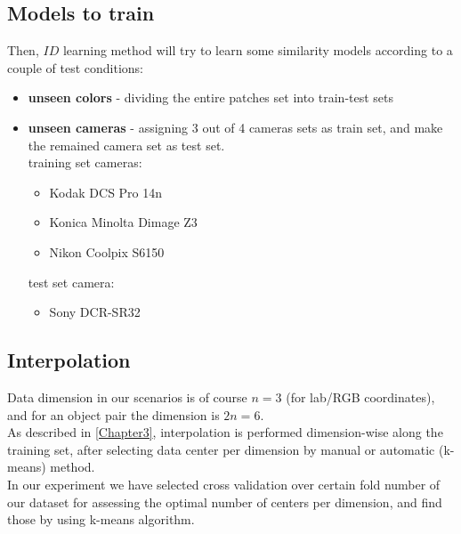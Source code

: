 \subsection{Models to train}
Then, $ID$ learning method will try to learn some similarity models according to a couple of test conditions:

\begin{itemize}
	\item \textbf{unseen colors} - dividing the entire patches set into train-test sets
	\item \textbf{unseen cameras} - assigning 3 out of 4 cameras sets as train set, and make the remained camera set as test set. \\
		training set cameras:
		\begin{itemize}
			\item Kodak DCS	Pro 14n
			\item Konica Minolta Dimage Z3
			\item Nikon Coolpix S6150
		\end{itemize}	
		
		test set camera:	
		\begin{itemize}
			\item Sony DCR-SR32
		\end{itemize}
		
\end{itemize}

\subsection{Interpolation}
Data dimension in our scenarios is of course $n=3$ (for lab/RGB \cite{RGB} coordinates), and for an object pair the dimension is $2n=6$. \\
As described in \ref{Chapter3}, interpolation is performed dimension-wise along the training set, after selecting data center per dimension by manual or automatic (k-means) method.
\\
In our experiment we have selected cross validation \cite{cross validation} over certain fold number of our dataset for assessing the optimal number of centers per dimension, and find those by using k-means \cite{kmeans} algorithm.


